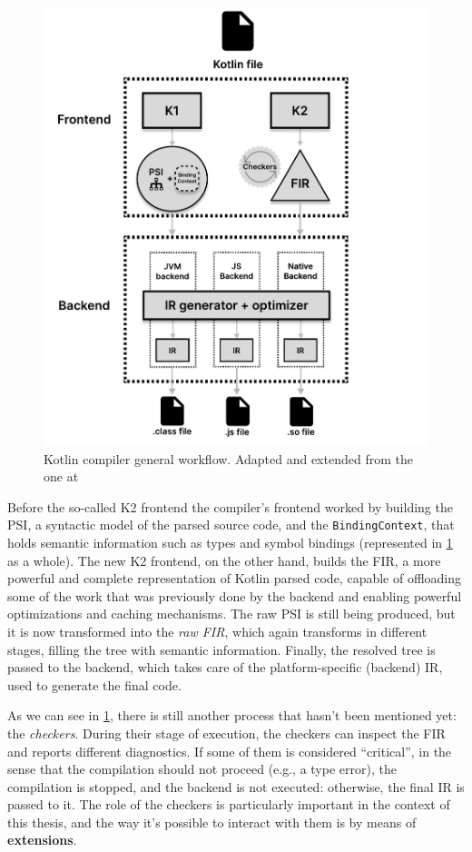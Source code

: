 \documentclass[12pt,a4paper,openright,twoside]{book}
\begin{document}
\begin{figure}
  \centering
  \includegraphics[width=.9\linewidth]{figures/kotlin-compiler-workflow.pdf}
  \caption{Kotlin compiler general workflow. Adapted and extended from the one
  at \cite{moskala2023}}
  \label{fig:kotlin-compiler-workflow}
\end{figure}

Before the so-called K2 frontend the compiler's frontend worked by
building the \ac{PSI}, a syntactic model of the parsed source code, and the
\lstinline{BindingContext}, that holds semantic information such as types and
symbol bindings (represented in \cref{fig:kotlin-compiler-workflow} as a whole). 
%
The new K2 frontend, on the other hand, builds the \ac{FIR}, a more powerful and
complete representation of Kotlin parsed code, capable of offloading some of the
work that was previously done by the backend and enabling powerful optimizations
and caching mechanisms. The raw \ac{PSI} is still being produced, but it is now
transformed into the \emph{raw FIR}, which again transforms in different stages,
filling the tree with semantic information. Finally, the resolved tree is passed
to the backend, which takes care of the platform-specific (backend) \ac{IR}, used
to generate the final code.

As we can see in \cref{fig:kotlin-compiler-workflow}, there is still another
process that hasn't been mentioned yet: the \emph{checkers}. During their stage
of execution, the checkers can inspect the \ac{FIR} and reports different
diagnostics. If some of them is considered ``critical'', in the sense that the
compilation should not proceed (e.g., a type error), the compilation is stopped,
and the backend is not executed: otherwise, the final \ac{IR} is passed to it.
%
The role of the checkers is particularly important in the context of this
thesis, and the way it's possible to interact with them is by means of
\textbf{extensions}.
\end{document}
